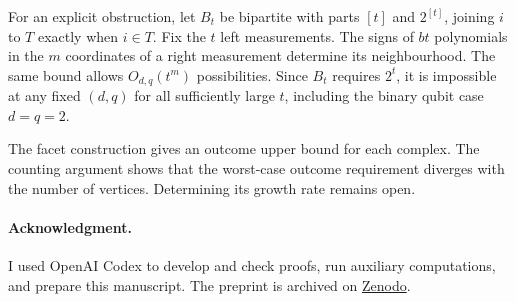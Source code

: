 \documentclass[11pt,a4paper]{article}
\theoremstyle{definition}
\begin{document}
For an explicit obstruction, let \(B_t\) be bipartite with parts \([t]\)
and \(2^{[t]}\), joining \(i\) to \(T\) exactly when \(i\in T\).
Fix the \(t\) left measurements. The signs of \(bt\) polynomials in the
\(m\) coordinates of a right measurement determine its neighbourhood.
The same bound allows \(O_{d,q}(t^m)\) possibilities. Since \(B_t\) requires
\(2^t\), it is impossible at any fixed \((d,q)\) for all sufficiently large
\(t\), including the binary qubit case \(d=q=2\).

The facet construction gives an outcome upper bound for each complex. The
counting argument shows that the worst-case outcome requirement diverges
with the number of vertices. Determining its growth rate remains open.

\paragraph{Acknowledgment.}
I used OpenAI Codex to develop and check proofs, run auxiliary
computations, and prepare this manuscript. The preprint is archived on
\href{https://doi.org/10.5281/zenodo.24528781}{Zenodo}.
\end{document}
